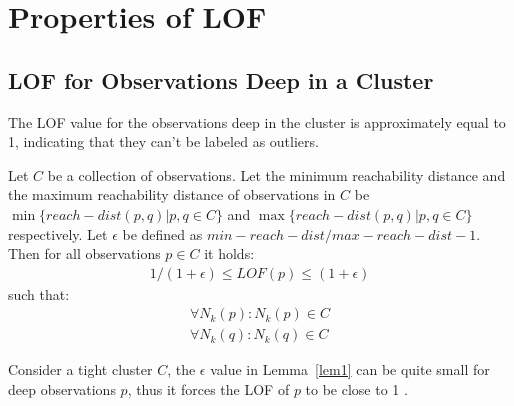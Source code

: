 \section{Properties of LOF}
\subsection{LOF for Observations Deep in a Cluster} The LOF value for the observations deep in the cluster is approximately equal to 1, indicating that they can't be labeled as outliers.
\begin{lem}
\label{lem1}
\citep{Markus} Let $C$ be a collection of observations. 
Let the minimum reachability distance and the maximum reachability distance of observations in $C$ be $\min \lbrace reach-dist(p,q)|p,q \in C \rbrace$ and $\max \lbrace reach-dist(p,q)|p,q \in C \rbrace$ respectively. Let $\epsilon$ be defined as $min-reach-dist/max-reach-dist-1$. Then for all observations $p \in C$ it holds:
\begin{align}
1/(1+\epsilon) \leq LOF(p) \leq (1+\epsilon)
\end{align}
such that:
\begin{align}
\forall N_k(p):N_k(p) \in C \\
\forall N_k(q):N_k(q) \in C
\end{align}
\begin{comment}
(i) all the $k$-nearest neighbors q of p are in C, and
(ii) all the $k$-nearest neighbors o of q are also in C,
it holds that 1/(1 + ε) ≤ LOF(p) ≤ (1 + ε).
\end{comment}
\end{lem}
Consider a tight cluster $C$, the $\epsilon$ value in Lemma~\ref{lem1} can be quite small for deep observations $p$, thus it forces the LOF of $p$ to be close to 1 \citep{Markus}.
